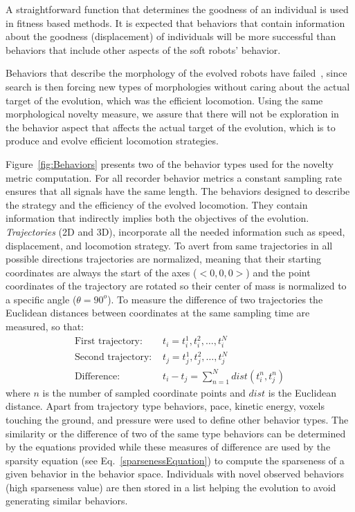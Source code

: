 \documentclass{sig-alternate}
\begin{document}
A straightforward function that determines the goodness of an individual is used in fitness based methods. It is expected that behaviors that contain information about the goodness (displacement) of individuals will be more successful than behaviors that include other aspects of the soft robots' behavior.

Behaviors that describe the morphology of the evolved robots have failed~\cite{lehman2011evolving}, since search is then forcing new types of morphologies without caring about the actual target of the evolution, which was the efficient locomotion. Using the same morphological novelty measure, we assure that there will not be exploration in the behavior aspect that affects the actual target of the evolution, which is to produce and evolve efficient locomotion strategies.

Figure~\ref{fig:Behaviors} presents two of the behavior types used for the novelty metric computation. For all recorder behavior metrics a constant sampling rate ensures that all signals have the same length. The behaviors designed to describe the strategy and the efficiency of the evolved  locomotion. They contain information that indirectly implies both the objectives of the evolution. \emph{Trajectories} (2D and 3D), incorporate all the needed information such as speed, displacement, and locomotion strategy. To avert from same trajectories in all possible directions trajectories are normalized, meaning that their starting coordinates are always the start of the axes ($<0,0,0>$) and the point coordinates of the trajectory are rotated so their center of mass is normalized to a specific angle ($\theta = 90^{o}$). To measure the difference of two trajectories the Euclidean distances between coordinates at the same sampling time are measured, so that:
\begin{align}
\text{First trajectory: } &t_i = t_i^1, t_i^2, \ldots, t_i^N\\
\text{Second trajectory: } &t_j = t_j^1, t_j^2, \ldots, t_j^N\\
\text{Difference: } &t_i - t_j = \sum_{n=1}^{N} dist( t_i^n, t_j^n )
\end{align}
where $n$ is the number of sampled coordinate points and $dist$ is the Euclidean distance. Apart from trajectory type behaviors, pace, kinetic energy, voxels touching the ground, and pressure were used to define other behavior types. The similarity or the difference of two of the same type behaviors can be determined by the equations provided while these measures of difference are used by the sparsity equation (see Eq.~\ref{sparsenessEquation}) to compute the sparseness of a given behavior in the behavior space. Individuals with novel observed behaviors (high sparseness value) are then stored in a list helping the evolution to avoid generating similar behaviors.
\end{document}
